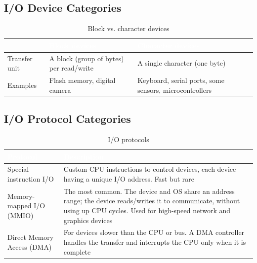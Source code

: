 \subsection{I/O Device Categories}

\begin{table}[h!]
	\centering
	\renewcommand{\arraystretch}{1.4}
	\begin{tabularx}{\textwidth}{|>{\raggedright\arraybackslash}p{3.2cm}|>{\raggedright\arraybackslash}X|>{\raggedright\arraybackslash}X|}
		\hline
		\rowcolor{TableCyan}
		& \textcolor{white}{\textbf{Block devices}} & \textcolor{white}{\textbf{Character devices}} \\ \hline
		\rowcolor{TableLightBlue}
		Transfer unit & A block (group of bytes) per read/write & A single character (one byte) \\ \hline
		\rowcolor{TableLightBlue}
		Examples & Flash memory, digital camera & Keyboard, serial ports, some sensors, microcontrollers \\ \hline
	\end{tabularx}
	\caption{Block vs. character devices}
\end{table}

\subsection{I/O Protocol Categories}

\begin{table}[h!]
	\centering
	\renewcommand{\arraystretch}{1.4}
	\begin{tabularx}{\textwidth}{|>{\raggedright\arraybackslash}p{3.8cm}|>{\raggedright\arraybackslash}X|}
		\hline
		\rowcolor{TableCyan}
		\textcolor{white}{\textbf{Protocol}} & \textcolor{white}{\textbf{Description}} \\ \hline
		\rowcolor{TableLightBlue}
		Special instruction I/O & Custom CPU instructions to control devices, each device having a unique I/O address. Fast but rare \\ \hline
		\rowcolor{TableLightBlue}
		Memory-mapped I/O (MMIO) & The most common. The device and OS share an address range; the device reads/writes it to communicate, without using up CPU cycles. Used for high-speed network and graphics devices \\ \hline
		\rowcolor{TableLightBlue}
		Direct Memory Access (DMA) & For devices slower than the CPU or bus. A DMA controller handles the transfer and interrupts the CPU only when it is complete \\ \hline
	\end{tabularx}
	\caption{I/O protocols}
\end{table}

